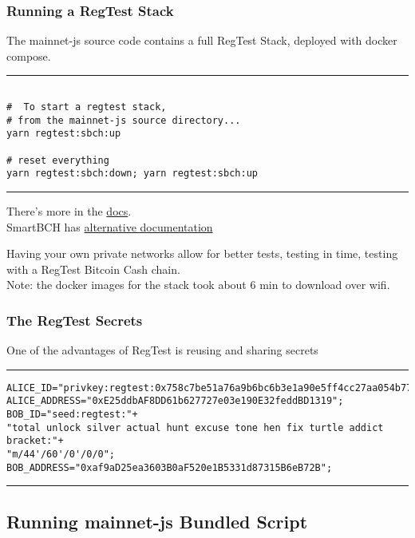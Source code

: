 \documentclass{beamer}
\begin{document}
\begin{frame}[fragile]
    \frametitle{Running a RegTest Stack}
      The mainnet-js source code contains a full RegTest Stack, deployed with docker compose.
    \rule{\textwidth}{0.6pt}
    \tiny
    \begin{verbatim}

#  To start a regtest stack,
# from the mainnet-js source directory...
yarn regtest:sbch:up

# reset everything
yarn regtest:sbch:down; yarn regtest:sbch:up
    \end{verbatim}
\rule{\textwidth}{0.6pt}
There's more in the \href{http://mainnet.cash/tutorial/#regtest-wallets}{docs}.\\

SmartBCH has \href{https://docs.smartbch.org/smartbch/developers-guide/runsinglenode}{alternative documentation} 

Having your own private networks allow for better tests, testing in time, testing with a RegTest Bitcoin Cash chain. \\ 
Note: the docker images for the stack took about 6 min to download over wifi.
\end{frame}

\begin{frame}[fragile]
    \frametitle{The RegTest Secrets}
    One of the advantages of RegTest is reusing and sharing secrets  
    \rule{\textwidth}{0.4pt}
    \tiny
    \begin{verbatim}
ALICE_ID="privkey:regtest:0x758c7be51a76a9b6bc6b3e1a90e5ff4cc27aa054b77b7acb6f4f08a219c1ce45";
ALICE_ADDRESS="0xE25ddbAF8DD61b627727e03e190E32feddBD1319";
BOB_ID="seed:regtest:"+
"total unlock silver actual hunt excuse tone hen fix turtle addict bracket:"+
"m/44'/60'/0'/0/0";
BOB_ADDRESS="0xaf9aD25ea3603B0aF520e1B5331d87315B6eB72B";
    \end{verbatim}
\rule{\textwidth}{0.4pt}
\end{frame}





\subsection[Javascript]{Running mainnet-js Bundled Script}
\end{document}
